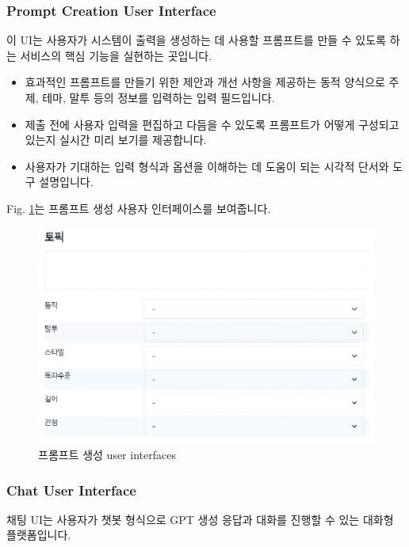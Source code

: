 \documentclass[a4paper, 12pt]{article}
\begin{document}
\subsubsection{Prompt Creation User Interface}

이 UI는 사용자가 시스템이 출력을 생성하는 데 사용할 프롬프트를 만들 수 있도록 하는 서비스의 핵심 기능을 실현하는 곳입니다.

\begin{itemize}
\item 효과적인 프롬프트를 만들기 위한 제안과 개선 사항을 제공하는 동적 양식으로 주제, 테마, 말투 등의 정보를 입력하는 입력 필드입니다.
\item 제출 전에 사용자 입력을 편집하고 다듬을 수 있도록 프롬프트가 어떻게 구성되고 있는지 실시간 미리 보기를 제공합니다.
\item 사용자가 기대하는 입력 형식과 옵션을 이해하는 데 도움이 되는 시각적 단서와 도구 설명입니다.
\end{itemize}

Fig. \ref{fig:prompt}는 프롬프트 생성 사용자 인터페이스를 보여줍니다.

\begin{figure}[H]
\centering
\includegraphics[width=1\textwidth]{img/prompt.png}
\caption{프롬프트 생성 user interfaces}
\label{fig:prompt}
\end{figure}

\subsubsection{Chat User Interface}

채팅 UI는 사용자가 챗봇 형식으로 GPT 생성 응답과 대화를 진행할 수 있는 대화형 플랫폼입니다.
\end{document}
